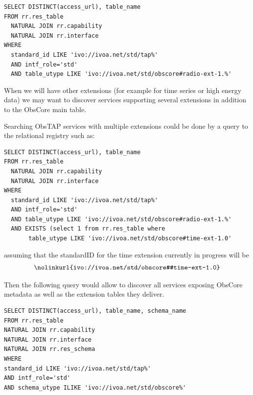 \documentclass[11pt,a4paper]{ivoa}
\begin{document}
\begin{lstlisting}
SELECT DISTINCT(access_url), table_name
FROM rr.res_table
  NATURAL JOIN rr.capability
  NATURAL JOIN rr.interface
WHERE
  standard_id LIKE 'ivo://ivoa.net/std/tap%'
  AND intf_role='std'
  AND table_utype LIKE 'ivo://ivoa.net/std/obscore#radio-ext-1.%'
\end{lstlisting}

When we will have other extensions (for example for time series or high energy data) we may want to
discover services  supporting  several extensions in addition to the ObsCore
main table.

Searching ObsTAP services with multiple extensions could be done by a query to the relational registry  such as:

\begin{lstlisting}
SELECT DISTINCT(access_url), table_name
FROM rr.res_table
  NATURAL JOIN rr.capability
  NATURAL JOIN rr.interface
WHERE
  standard_id LIKE 'ivo://ivoa.net/std/tap%'
  AND intf_role='std'
  AND table_utype LIKE 'ivo://ivoa.net/std/obscore#radio-ext-1.%'
  AND EXISTS (select 1 from rr.res_table where
       table_utype LIKE 'ivo://ivoa.net/std/obscore#time-ext-1.0'
\end{lstlisting}

assuming that the standardID for the time extension currently in progress will be
$$
\hbox{\nolinkurl{ivo://ivoa.net/std/obscore#time-ext-1.0}}
$$

Then the following query would allow to discover all services exposing ObsCore metadata as well as  the extension tables they deliver.

\begin{lstlisting}
SELECT DISTINCT(access_url), table_name, schema_name
FROM rr.res_table
NATURAL JOIN rr.capability
NATURAL JOIN rr.interface
NATURAL JOIN rr.res_schema
WHERE
standard_id LIKE 'ivo://ivoa.net/std/tap%'
AND intf_role='std'
AND schema_utype ILIKE 'ivo://ivoa.net/std/obscore%'
\end{lstlisting}

\newpage
\appendix





\end{document}
